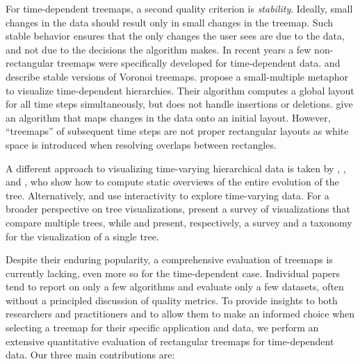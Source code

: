 For time-dependent treemaps, a second quality criterion is \emph{stability}. Ideally, small changes in the data should result only in small changes in the treemap. Such stable behavior ensures that the only changes the user sees are due to the data, and not due to the decisions the algorithm makes.
%
In recent years a few non-rectangular treemaps were specifically developed for time-dependent data. \cite{hahn10} and \cite{hees17} describe stable versions of Voronoi treemaps. \cite{Chen2017} propose a small-multiple metaphor to visualize time-dependent hierarchies. Their algorithm computes a global layout for all time steps simultaneously, but does not handle insertions or deletions. \cite{Scheibel2018} give an algorithm that maps changes in the data onto an initial layout. However, ``treemaps'' of subsequent time steps are not proper rectangular layouts as white space is introduced when resolving overlaps between rectangles.
%

A different approach to visualizing time-varying hierarchical data is taken by 
\cite{lukasczyk2017nested}, \cite{kopp2019temporal}, and \cite{li19}, who show how to compute static overviews of the entire evolution of the tree. Alternatively, \cite{StemView} and \cite{TimeTree} use interactivity to explore time-varying data. 
For a broader perspective on tree visualizations, \cite{graham10} present a survey of visualizations that compare multiple trees, while \cite{schulz11_treesurvey} and \cite{scheibel20} present, respectively, a survey and a taxonomy for the visualization of a single tree. 


 Despite their enduring popularity, a comprehensive evaluation of treemaps is currently lacking, even more so for the time-dependent case. Individual papers tend to report on only a few algorithms and evaluate only a few datasets, often without a principled discussion of quality metrics. To provide insights to both researchers and practitioners and to allow them to make an informed choice when selecting a treemap for their specific application and data, we perform an extensive quantitative evaluation of rectangular treemaps for time-dependent data. Our three main contributions are:


